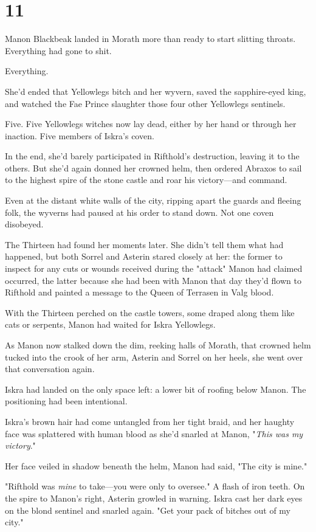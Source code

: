 
\chapter{11}

Manon Blackbeak landed in Morath more than ready to start slitting throats.
Everything had gone to shit.

Everything.

She'd ended that Yellowlegs bitch and her wyvern, saved the sapphire-eyed king, and watched the Fae Prince slaughter those four other Yellowlegs sentinels.

Five.
Five Yellowlegs witches now lay dead, either by her hand or through her inaction.
Five members of Iskra's coven.

In the end, she'd barely participated in Rifthold's destruction, leaving it to the others.
But she'd again donned her crowned helm, then ordered Abraxos to sail to the highest spire of the stone castle and roar his victory---and command.

Even at the distant white walls of the city, ripping apart the guards and fleeing folk, the wyverns had paused at his order to stand down.
Not one coven disobeyed.

The Thirteen had found her moments later.
She didn't tell them what had happened, but both Sorrel and Asterin stared closely at her: the former to inspect for any cuts or wounds received during the "attack" Manon had claimed occurred, the latter because she had been with Manon that day they'd flown to Rifthold and painted a message to the Queen of Terrasen in Valg blood.

With the Thirteen perched on the castle towers, some draped along them like cats or serpents, Manon had waited for Iskra Yellowlegs.

As Manon now stalked down the dim, reeking halls of Morath, that crowned helm tucked into the crook of her arm, Asterin and Sorrel on her heels, she went over that conversation again.

Iskra had landed on the only space left: a lower bit of roofing below Manon.
The positioning had been intentional.

Iskra's brown hair had come untangled from her tight braid, and her haughty face was splattered with human blood as she'd snarled at Manon, "\emph{This was my victory}."

Her face veiled in shadow beneath the helm, Manon had said, "The city is mine."

"Rifthold was \emph{mine} to take---you were only to oversee."
A flash of iron teeth.
On the spire to Manon's right, Asterin growled in warning.
Iskra cast her dark eyes on the blond sentinel and snarled again.
"Get your pack of bitches out of my city."

